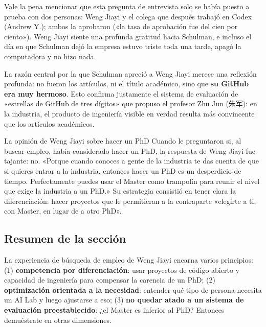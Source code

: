 Vale la pena mencionar que esta pregunta de entrevista solo se había puesto a prueba con dos personas: Weng Jiayi y el colega que después trabajó en Codex (Andrew Y.); ambos la aprobaron («la tasa de aprobación fue del cien por ciento»). Weng Jiayi siente una profunda gratitud hacia Schulman, e incluso el día en que Schulman dejó la empresa estuvo triste toda una tarde, apagó la computadora y no hizo nada.

La razón central por la que Schulman apreció a Weng Jiayi merece una reflexión profunda: no fueron los artículos, ni el título académico, sino que \textbf{su GitHub era muy hermoso}. Esto confirma justamente el sistema de evaluación de «estrellas de GitHub de tres dígitos» que propuso el profesor Zhu Jun (朱军): en la industria, el producto de ingeniería visible en verdad resulta más convincente que los artículos académicos.

\begin{knowledgebox}{La opinión de Weng Jiayi sobre hacer un PhD}
Cuando le preguntaron si, al buscar empleo, había considerado hacer un PhD, la respuesta de Weng Jiayi fue tajante: no. «Porque cuando conoces a gente de la industria te das cuenta de que si quieres entrar a la industria, entonces hacer un PhD es un desperdicio de tiempo. Perfectamente puedes usar el Master como trampolín para reunir el nivel que exige la industria a un PhD.» Su estrategia consistió en tener clara la diferenciación: hacer proyectos que le permitieran a la contraparte «elegirte a ti, con Master, en lugar de a otro PhD».
\end{knowledgebox}

\subsection{Resumen de la sección}

La experiencia de búsqueda de empleo de Weng Jiayi encarna varios principios: (1) \textbf{competencia por diferenciación}: usar proyectos de código abierto y capacidad de ingeniería para compensar la carencia de un PhD; (2) \textbf{optimización orientada a la necesidad}: entender qué tipo de persona necesita un AI Lab y luego ajustarse a eso; (3) \textbf{no quedar atado a un sistema de evaluación preestablecido}: ¿el Master es inferior al PhD? Entonces demuéstrate en otras dimensiones.

